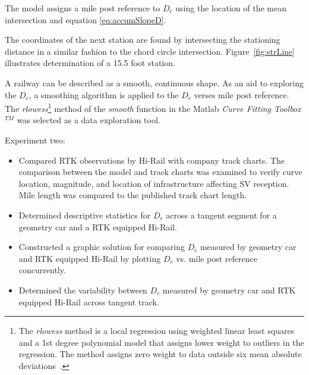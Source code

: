 The model assigns a mile post reference to $D_c$ using the location of the mean intersection and equation \ref{eq:accumSlopeD}.

The coordinates of the next station are found by intersecting the stationing distance in a similar fashion to the chord circle intersection. Figure~\ref{fig:strLine} illustrates determination of a 15.5 foot station. 

A railway can be described as a smooth, continuous shape. As an aid to exploring the $D_c$, a smoothing algorithm is applied to the $D_c$ verses mile post reference.  The \emph{rlowess}\footnote{The \emph{rlowess} method is a local regression using weighted linear least squares and a 1st degree polynomial model that assigns lower weight to outliers in the regression. The method assigns zero weight to data outside six mean absolute deviations~\citep{matlab09}.} method of the \emph{smooth} function in the Matlab \emph{Curve Fitting Toolbox}$^{TM}$ was selected as a data exploration tool.

Experiment two:
\begin{itemize}
	\item Compared RTK observations by Hi-Rail with company track charts. The comparison between the model and track charts was examined to verify curve location, magnitude, and location of infrastructure affecting SV reception. Mile length was compared to the published track chart length.
	\item Determined descriptive statistics for  $D_c$  across a tangent segment for a geometry car and a RTK equipped Hi-Rail.
	\item Constructed a graphic solution for comparing $D_c$ measured by geometry car and RTK equipped Hi-Rail by plotting $D_c$ vs. mile post reference concurrently.
	\item Determined the variability between $D_c$ measured by geometry car and RTK equipped Hi-Rail across tangent track.
\end{itemize}

